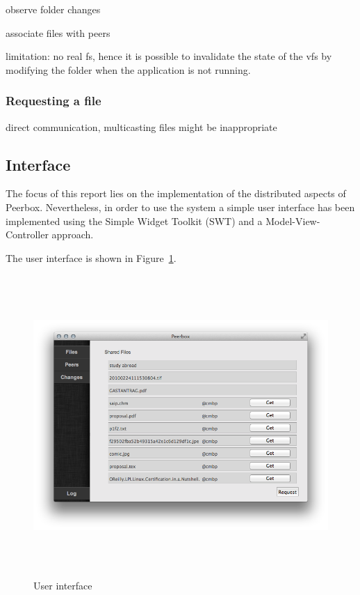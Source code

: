     observe folder changes
    

    
    associate files with peers
    
    limitation: no real fs, hence it is possible to invalidate the state of the vfs by modifying the folder when the application is not running. 
    
    \subsubsection{Requesting a file}
    direct communication, multicasting files might be inappropriate
        
    

\subsection{Interface}
The focus of this report lies on the implementation of the distributed aspects of Peerbox. Nevertheless, in order to use the system a simple user interface has been implemented using the Simple Widget Toolkit (SWT) and a Model-View-Controller approach. 

The user interface is shown in Figure~\ref{fig:figures_gui}.

\begin{figure}[htbp]
    \centering
        \includegraphics[height=4.5in]{figures/gui.png}
    \caption{User interface}
    \label{fig:figures_gui}
\end{figure}
